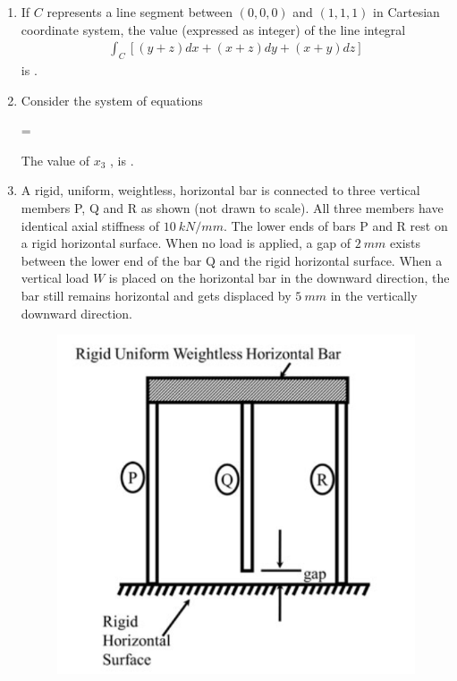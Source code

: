 \documentclass[journal]{IEEEtran}
\begin{document}
\begin{enumerate}
\item If $C$ represents a line segment between $(0,0,0)$ and $(1,1,1)$ in Cartesian coordinate system, the value (expressed as integer) of the line integral  
\begin{align}
\int_C \left[ (y+z)dx + (x+z)dy + (x+y)dz \right]
\end{align}  
is \underline{\hspace{2cm}}. \hfill {}

\item Consider the system of equations  

=

The value of $x_3$ , is \underline{\hspace{2cm}}. \hfill {}

\item A rigid, uniform, weightless, horizontal bar is connected to three vertical members P, Q and R as shown (not drawn to scale). All three members have identical axial stiffness of $10 \ kN/mm$. The lower ends of bars P and R rest on a rigid horizontal surface. When no load is applied, a gap of $2 \ mm$ exists between the lower end of the bar Q and the rigid horizontal surface. When a vertical load $W$ is placed on the horizontal bar in the downward direction, the bar still remains horizontal and gets displaced by $5 \ mm$ in the vertically downward direction.  

\begin{figure}[H]
    \centering
    \includegraphics[width=0.3\columnwidth]{figs/Q51.png} 
    \caption{}
    \label{fig:placeholder}
\end{figure}


\end{enumerate}
\end{document}
